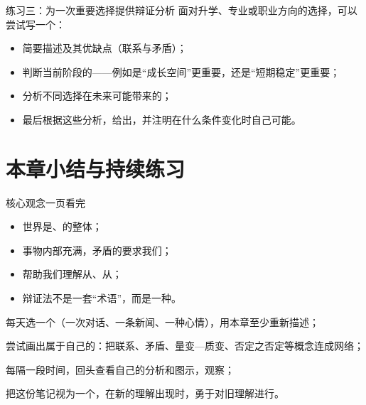 \documentclass[a4paper,11pt]{ctexart}
\begin{document}
\begin{examplebox}{练习三：为一次重要选择提供辩证分析}
面对升学、专业或职业方向的选择，可以尝试写一个：
\begin{itemize}
  \item 简要描述及其优缺点（联系与矛盾）；
  \item 判断当前阶段的——例如是“成长空间”更重要，还是“短期稳定”更重要；
  \item 分析不同选择在未来可能带来的；
  \item 最后根据这些分析，给出，并注明在什么条件变化时自己可能。
\end{itemize}
\end{examplebox}

\section{本章小结与持续练习}

\begin{summarybox}{核心观念一页看完}
\begin{itemize}
  \item 世界是、的整体；
  \item 事物内部充满，矛盾的要求我们；
  \item {}帮助我们理解从、从；
  \item 辩证法不是一套“术语”，而是一种。
\end{itemize}
\end{summarybox}

\begin{focuspoints}
  \item 每天选一个（一次对话、一条新闻、一种心情），用本章至少重新描述；
  \item 尝试画出属于自己的：把联系、矛盾、量变—质变、否定之否定等概念连成网络；
  \item 每隔一段时间，回头查看自己的分析和图示，观察；
  \item 把这份笔记视为一个，在新的理解出现时，勇于对旧理解进行。
\end{focuspoints}
\end{document}
